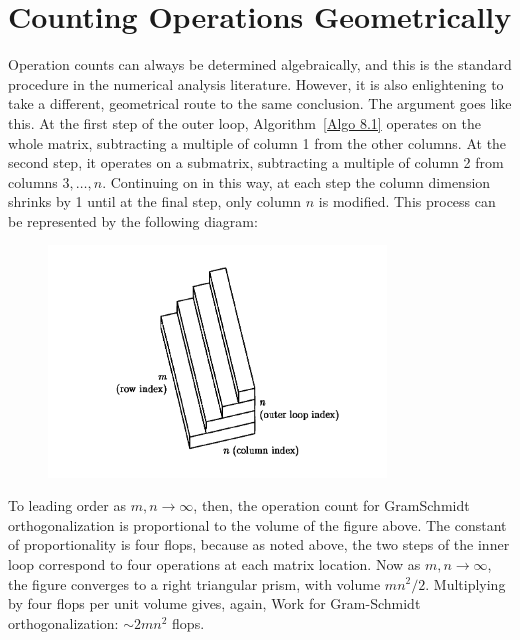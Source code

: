 \section{Counting Operations Geometrically}
Operation counts can always be determined algebraically, and this is the standard procedure in the numerical analysis literature. However, it is also enlightening to take a different, geometrical route to the same conclusion. The argument goes like this. At the first step of the outer loop, Algorithm~\ref{Algo 8.1} operates on the whole matrix, subtracting a multiple of column 1 from the other columns. At the second step, it operates on a submatrix, subtracting a multiple of column 2 from columns $3, \ldots, n$. Continuing on in this way, at each step the column dimension shrinks by 1 until at the final step, only column $n$ is modified. This process can be represented by the following diagram:
\begin{figure}[H]
    \centering
    \includegraphics[width=0.8\textwidth]{figures/8-1.png}
\end{figure}
To leading order as $m, n \rightarrow \infty$, then, the operation count for GramSchmidt orthogonalization is proportional to the volume of the figure above. The constant of proportionality is four flops, because as noted above, the two steps of the inner loop correspond to four operations at each matrix location. Now as $m, n \rightarrow \infty$, the figure converges to a right triangular prism, with volume $m n^2 / 2$. Multiplying by four flops per unit volume gives, again,
Work for Gram-Schmidt orthogonalization: $\sim 2 m n^2$ flops.

